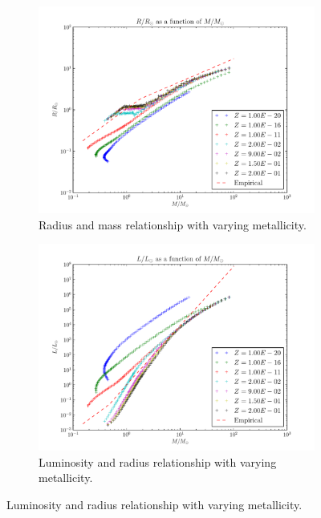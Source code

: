\documentclass[11pt]{article}
\begin{document}
    \begin{center}
        \begin{figure}[H]
            \begin{subfigure}{.5\textwidth}
                \centering
                \includegraphics[width=1.1\textwidth]{figures/RvM.pdf}
                \caption{Radius and mass relationship with varying metallicity.}
                \label{fig:RvM}
            \end{subfigure}
            \begin{subfigure}{.5\textwidth}
                \centering
                \includegraphics[width=1.1\textwidth]{figures/LvM.pdf}
                \caption{Luminosity and radius relationship with varying metallicity.}
                \label{fig:LvM}
            \end{subfigure}
        \end{figure}
    \end{center}
\end{document}
